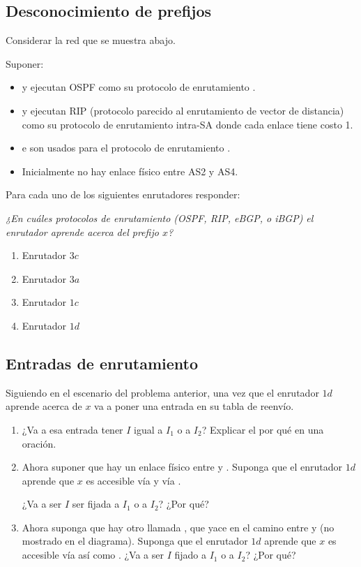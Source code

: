 \documentclass[12pt]{report}
\begin{document}
\begin{exer}
\subsection{Desconocimiento de prefijos \sthree}

Considerar la red que se muestra abajo. 

Suponer:
\begin{itemize}
\item {} y  ejecutan OSPF como su protocolo de enrutamiento .
\item {} y  ejecutan RIP (protocolo parecido al enrutamiento de vector de distancia) como su protocolo de enrutamiento intra-SA donde cada enlace tiene costo 1.
\item {} e  son usados para el protocolo de enrutamiento .
\item Inicialmente no hay enlace físico entre AS2 y AS4.
\end{itemize}


Para cada uno de los siguientes enrutadores responder: 

\emph{¿En cuáles protocolos de enrutamiento (OSPF, RIP, eBGP, o iBGP) el enrutador aprende acerca del prefijo $x$?}

\begin{enumerate}
\item Enrutador $3c$
\item Enrutador $3a$
\item Enrutador $1c$
\item Enrutador $1d$
\end{enumerate}
\end{exer}

\begin{exer}
\subsection{Entradas de enrutamiento \sthree}

Siguiendo en el escenario del problema anterior, una vez que el enrutador $1d$ aprende acerca de $x$ va a poner una entrada  en su tabla de reenvío. 

\begin{enumerate}
\item ¿Va a esa entrada tener $I$ igual a $I_1$ o a $I_2$? Explicar el por qué en una oración.
\item Ahora suponer que hay un enlace físico entre  y . Suponga que el enrutador $1d$ aprende que $x$ es accesible vía  y vía .

¿Va a ser $I$ ser fijada a $I_1$ o a $I_2$? ¿Por qué?
\item Ahora suponga que hay otro  llamada , que yace en el camino entre  y 
(no mostrado en el diagrama). Suponga que el enrutador $1d$ aprende que $x$ es accesible vía
 así como . ¿Va a ser $I$ fijado a $I_1$ o a $I_2$? ¿Por qué?
\end{enumerate}
\end{exer}
\end{document}
